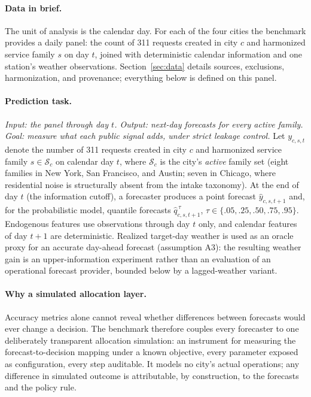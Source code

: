 \paragraph{Data in brief.}
The unit of analysis is the calendar day. For each of the four cities
the benchmark provides a daily panel: the count of 311 requests created
in city $c$ and harmonized service family $s$ on day $t$, joined with
deterministic calendar information and one station's weather
observations. Section~\ref{sec:data} details sources, exclusions, harmonization, and
provenance; everything below is defined on this panel.

\paragraph{Prediction task.}
\emph{Input: the panel through day $t$. Output: next-day forecasts for
every active family. Goal: measure what each public signal adds, under
strict leakage control.}
Let $y_{c,s,t}$ denote the number of 311 requests created in city $c$ and
harmonized service family $s \in \mathcal{S}_c$ on calendar day $t$, where
$\mathcal{S}_c$ is the city's \emph{active} family set (eight families in
New York, San Francisco, and Austin; seven in Chicago, where residential
noise is structurally absent from the intake taxonomy). At the end of day
$t$ (the information cutoff), a forecaster produces a point forecast
$\hat{y}_{c,s,t+1}$ and, for the probabilistic model, quantile forecasts
$\hat{q}^{\,\tau}_{c,s,t+1}$, $\tau \in \{.05,.25,.50,.75,.95\}$.
Endogenous features use observations through day $t$ only, and calendar
features of day $t{+}1$ are deterministic. Realized target-day weather
is used as an oracle proxy for an accurate day-ahead forecast
(assumption A3): the resulting weather gain is an upper-information
experiment rather than an evaluation of an operational forecast
provider, bounded below by a lagged-weather variant.

\paragraph{Why a simulated allocation layer.}
Accuracy metrics alone cannot reveal whether differences between
forecasts would ever change a decision. The benchmark therefore couples
every forecaster to one deliberately transparent allocation simulation:
an instrument for measuring the forecast-to-decision mapping under a
known objective, every parameter exposed as configuration, every step
auditable. It models no city's actual operations; any difference in
simulated outcome is attributable, by construction, to the forecasts
and the policy rule.

